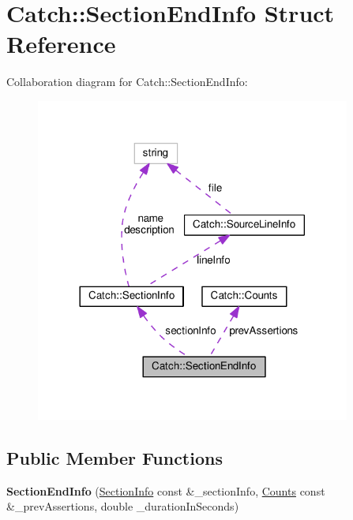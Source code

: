 \hypertarget{structCatch_1_1SectionEndInfo}{}\section{Catch\+:\+:Section\+End\+Info Struct Reference}
\label{structCatch_1_1SectionEndInfo}


Collaboration diagram for Catch\+:\+:Section\+End\+Info\+:
\nopagebreak
\begin{figure}[H]
\begin{center}
\leavevmode
\includegraphics[width=293pt]{structCatch_1_1SectionEndInfo__coll__graph}
\end{center}
\end{figure}
\subsection*{Public Member Functions}
\begin{DoxyCompactItemize}
\item 
{\bfseries Section\+End\+Info} (\hyperlink{structCatch_1_1SectionInfo}{Section\+Info} const \&\+\_\+section\+Info, \hyperlink{structCatch_1_1Counts}{Counts} const \&\+\_\+prev\+Assertions, double \+\_\+duration\+In\+Seconds)\hypertarget{structCatch_1_1SectionEndInfo_abc9381c7c22b6907317ec985ccaa6713}{}\label{structCatch_1_1SectionEndInfo_abc9381c7c22b6907317ec985ccaa6713}

\end{DoxyCompactItemize}
